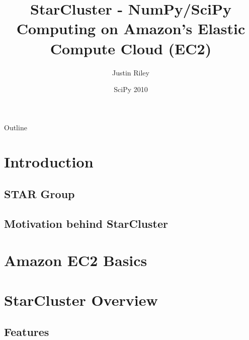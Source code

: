 \documentclass[english,compress]{beamer}
\title{StarCluster - NumPy/SciPy Computing on Amazon's Elastic Compute Cloud (EC2)}
\author{Justin Riley}
\institute[Massachusetts Institute of Technology] %
{
  Software Tools for Academics and Researchers\\
  Office of Educational Innovation and Technology\\
  Massachusetts Institute of Technology}
\date[SciPy 2010]{SciPy 2010}
\begin{document}

\frame{\titlepage}

\section[Outline]{}
\begin{frame}{Outline}
  \tableofcontents
\end{frame}

\section{Introduction}
\subsection{STAR Group}

\subsection{Motivation behind StarCluster}




\section{Amazon EC2 Basics}



\questionframe{}

\section{StarCluster Overview}
\subsection{Features}



\end{document}
